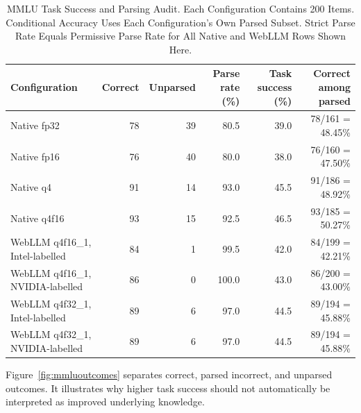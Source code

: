 \documentclass[conference]{IEEEtran}
\begin{document}
\begin{table}[t]
\caption{
MMLU Task Success and Parsing Audit.
Each Configuration Contains 200 Items.
Conditional Accuracy Uses Each Configuration's Own
Parsed Subset. Strict Parse Rate Equals Permissive Parse
Rate for All Native and WebLLM Rows Shown Here.
}
\label{tab:mmluparsing}
\centering
\footnotesize
\setlength{\tabcolsep}{6pt}
\begin{tabular}{@{}lrrrrr@{}}
\toprule
Configuration &
Correct &
Unparsed &
Parse rate (\%) &
Task success (\%) &
Correct among parsed\\
\midrule
Native fp32 &
78 & 39 & 80.5 & 39.0 &
78/161 = 48.45\%\\

Native fp16 &
76 & 40 & 80.0 & 38.0 &
76/160 = 47.50\%\\

Native q4 &
91 & 14 & 93.0 & 45.5 &
91/186 = 48.92\%\\

Native q4f16 &
93 & 15 & 92.5 & 46.5 &
93/185 = 50.27\%\\

WebLLM q4f16\_1, Intel-labelled &
84 & 1 & 99.5 & 42.0 &
84/199 = 42.21\%\\

WebLLM q4f16\_1, NVIDIA-labelled &
86 & 0 & 100.0 & 43.0 &
86/200 = 43.00\%\\

WebLLM q4f32\_1, Intel-labelled &
89 & 6 & 97.0 & 44.5 &
89/194 = 45.88\%\\

WebLLM q4f32\_1, NVIDIA-labelled &
89 & 6 & 97.0 & 44.5 &
89/194 = 45.88\%\\
\bottomrule
\end{tabular}
\end{table}

Figure~\ref{fig:mmluoutcomes} separates correct, parsed
incorrect, and unparsed outcomes. It illustrates why higher
task success should not automatically be interpreted as
improved underlying knowledge.
\end{document}
